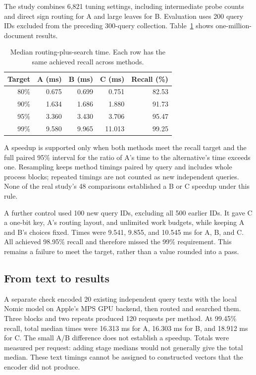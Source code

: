 \documentclass[11pt,a4paper]{article}
\begin{document}
The study combines 6,821 tuning settings, including intermediate probe counts and direct
sign routing for A and large leaves for B. Evaluation uses 200 query IDs excluded from the
preceding 300-query collection. Table~\ref{tab:real} shows one-million-document results.

\begin{table}[h]\centering
\caption{Median routing-plus-search time. Each row has the same achieved recall across methods.}
\label{tab:real}
\begin{tabular}{@{}rrrrr@{}}\toprule
Target & A (ms) & B (ms) & C (ms) & Recall (\%)\\\midrule
80\% & 0.675 & 0.699 & 0.751 & 82.53\\
90\% & 1.634 & 1.686 & 1.880 & 91.73\\
95\% & 3.360 & 3.430 & 3.706 & 95.47\\
99\% & 9.580 & 9.965 & 11.013 & 99.25\\\bottomrule
\end{tabular}
\end{table}

A speedup is supported only when both methods meet the recall target and the full paired
95\% interval for the ratio of A's time to the alternative's time exceeds one. Resampling
keeps method timings paired by query and includes whole process blocks; repeated timings
are not counted as new independent queries. None of the real study's 48 comparisons
established a B or C speedup under this rule.

A further control used 100 new query IDs, excluding all 500 earlier IDs. It gave C a one-bit
key, A's routing layout, and unlimited work budgets, while keeping A and B's choices fixed.
Times were 9.541, 9.855, and 10.545 ms for A, B, and C. All achieved 98.95\% recall and
therefore missed the 99\% requirement. This remains a failure to meet the target, rather
than a value rounded into a pass.

\subsection{From text to results}
A separate check encoded 20 existing independent query texts with the local Nomic model on
Apple's MPS GPU backend, then routed and searched them. Three blocks and two repeats produced
120 requests per method. At 99.45\% recall, total median times were 16.313 ms for A,
16.303 ms for B, and 18.912 ms for C. The small A/B difference does not establish a speedup.
Totals were measured per request: adding stage medians would not generally give the total
median. These text timings cannot be assigned to constructed vectors that the encoder did
not produce.
\end{document}
